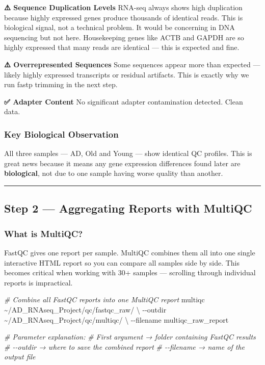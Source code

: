 \documentclass[
]{article}
\newenvironment{Shaded}{\begin{snugshade}}{\end{snugshade}}
\newcommand{\AttributeTok}[1]{\textcolor[rgb]{0.13,0.29,0.53}{#1}}
\newcommand{\CommentTok}[1]{\textcolor[rgb]{0.56,0.35,0.01}{\textit{#1}}}
\newcommand{\DataTypeTok}[1]{\textcolor[rgb]{0.13,0.29,0.53}{#1}}
\newcommand{\ExtensionTok}[1]{#1}
\newcommand{\NormalTok}[1]{#1}
\begin{document}
\textbf{⚠️ Sequence Duplication Levels} RNA-seq always shows high
duplication because highly expressed genes produce thousands of
identical reads. This is biological signal, not a technical problem. It
would be concerning in DNA sequencing but not here. Housekeeping genes
like ACTB and GAPDH are so highly expressed that many reads are
identical --- this is expected and fine.

\textbf{⚠️ Overrepresented Sequences} Some sequences appear more than
expected --- likely highly expressed transcripts or residual artifacts.
This is exactly why we run fastp trimming in the next step.

\textbf{✅ Adapter Content} No significant adapter contamination
detected. Clean data.

\subsubsection{Key Biological
Observation}\label{key-biological-observation}

All three samples --- AD, Old and Young --- show identical QC profiles.
This is great news because it means any gene expression differences
found later are \textbf{biological}, not due to one sample having worse
quality than another.

\begin{center}\rule{0.5\linewidth}{0.5pt}\end{center}

\subsection{Step 2 --- Aggregating Reports with
MultiQC}\label{step-2-aggregating-reports-with-multiqc}

\subsubsection{What is MultiQC?}\label{what-is-multiqc}

FastQC gives one report per sample. MultiQC combines them all into one
single interactive HTML report so you can compare all samples side by
side. This becomes critical when working with 30+ samples --- scrolling
through individual reports is impractical.

\begin{Shaded}
\begin{Highlighting}[]
\CommentTok{\# Combine all FastQC reports into one MultiQC report}
\ExtensionTok{multiqc}\NormalTok{ \textasciitilde{}/AD\_RNAseq\_Project/qc/fastqc\_raw/ }\DataTypeTok{\textbackslash{}}
    \AttributeTok{{-}{-}outdir}\NormalTok{ \textasciitilde{}/AD\_RNAseq\_Project/qc/multiqc/ }\DataTypeTok{\textbackslash{}}
    \AttributeTok{{-}{-}filename}\NormalTok{ multiqc\_raw\_report}

\CommentTok{\# Parameter explanation:}
\CommentTok{\# First argument → folder containing FastQC results}
\CommentTok{\# {-}{-}outdir      → where to save the combined report}
\CommentTok{\# {-}{-}filename    → name of the output file}
\end{Highlighting}
\end{Shaded}
\end{document}
